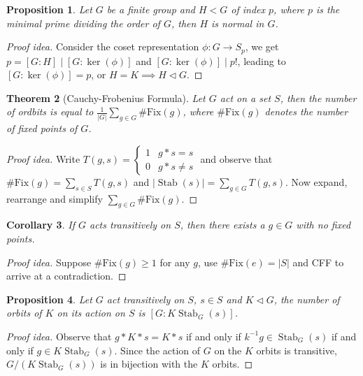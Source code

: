 \documentclass[paper=a4, fontsize=12pt]{scrartcl} %
\newtheorem{thm}{Theorem}[section]
\newtheorem{cor}[thm]{Corollary}
\newtheorem{prop}[thm]{Proposition}
\theoremstyle{definition}
\theoremstyle{remark}
\DeclareMathOperator{\stab}{Stab}
\numberwithin{equation}{section} %
\numberwithin{figure}{section} %
\numberwithin{table}{section} %
\begin{document}
\begin{prop}
	Let $G$ be a finite group and $H<G$ of index $p$, where $p$ is the minimal prime dividing the order of $G$, then $H$ is normal in $G$.
\end{prop}
\begin{proof}[Proof idea]
	Consider the coset representation $\phi : G \rightarrow S_p$, we get $p = [G:H]\mid [G:\ker(\phi)]$ and $[G:\ker(\phi)] \mid p!$, leading to $[G:\ker(\phi)] = p$, or $H = K \implies H \lhd G$.
\end{proof}
\begin{thm}[Cauchy-Frobenius Formula]
	Let $G$ act on a set $S$, then the number of ordbits is equal to $\frac{1}{|G|}\sum_{g \in G} \text{\#Fix}(g)$, where $\text{\#Fix}(g)$ denotes the number of fixed points of $G$.
\end{thm}
\begin{proof}[Proof idea]
	Write $T(g,s) = \begin{cases}1 & g*s = s\\0&g*s \neq s\end{cases}$ and observe that $\text{\#Fix}(g) = \sum_{s \in S}T(g,s)$ and $|\stab(s)| = \sum_{g \in G} T(g,s)$. Now expand, rearrange and simplify $\sum_{g \in G} \text{\#Fix}(g)$.
\end{proof}
\begin{cor}
	If $G$ acts transitively on $S$, then there exists a $g \in G$ with no fixed points.
\end{cor}
\begin{proof}[Proof idea]
	Suppose $\text{\#Fix}(g) \geq 1$ for any $g$, use $\text{\#Fix}(e) = |S|$ and CFF to arrive at a contradiction.
\end{proof}
\begin{prop}\label{prop:a3q3}
	Let $G$ act transitively on $S$, $s \in S$ and $K \lhd G$, the number of orbits of $K$ on its action on $S$ is $[G:K\stab_G(s)]$.
\end{prop}
\begin{proof}[Proof idea]
	Observe that $g*K*s = K*s$ if and only if $k^{-1}g \in \stab_G(s)$ if and only if $g \in K\stab_G(s)$. Since the action of $G$ on the $K$ orbits is transitive, $G/(K\stab_G(s))$ is in bijection with the $K$ orbits.
\end{proof}
\end{document}
